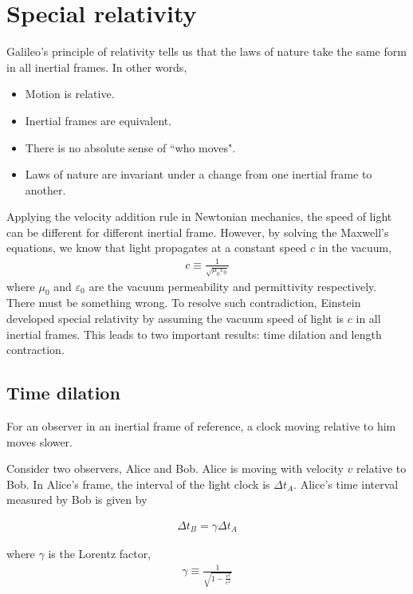 \documentclass[12pt]{book} %
\numberwithin{equation}{chapter}
\def\c{\gamma}
\def\D{\Delta}
\def\e{\varepsilon}
\begin{document}
\chapter{Special relativity}
Galileo's principle of relativity tells us that the laws of nature take the same form in all inertial frames. In other words,
\begin{itembox}
\begin{itemize}
\item Motion is relative.
\item Inertial frames are equivalent.
\item There is no absolute sense of ``who moves".
\item Laws of nature are invariant under a change from one inertial frame to another.
\end{itemize}
\end{itembox}
Applying the velocity addition rule in Newtonian mechanics, the speed of light can be different for different inertial frame. However, by solving the Maxwell's equations, we know that light propagates at a constant speed $c$ in the vacuum,
\begin{align*}
c\equiv\frac{1}{\sqrt{\mu_{0}\e_{0}}}
\end{align*}
where $\mu_{0}$ and $\e_{0}$ are the vacuum permeability and permittivity respectively. There must be something wrong.\bigskip\newline
To resolve such contradiction, Einstein developed special relativity by assuming the vacuum speed of light is $c$ in all inertial frames. This leads to two important results: time dilation and length contraction.

\section{Time dilation}
For an observer in an inertial frame of reference, a clock moving relative to him moves slower.
\begin{example}
Consider two observers, Alice and Bob. Alice is moving with velocity $v$ relative to Bob. In Alice's frame, the interval of the light clock is $\D t_{A}$. Alice's time interval measured by Bob is given by
\begin{eqnbox}
\begin{align}
\D t_{B}=\c\D t_{A}
\end{align}
\end{eqnbox}
where $\c$ is the Lorentz factor,
\begin{align*}
\c\equiv\frac{1}{\sqrt{1-\frac{v^2}{c^2}}}
\end{align*}
\end{example}
\end{document}
